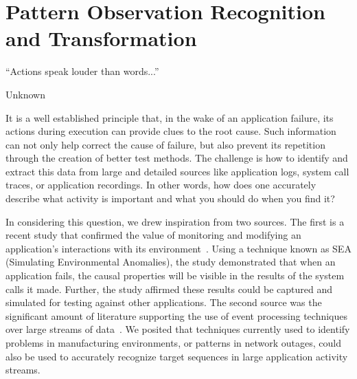 \chapter{Pattern Observation Recognition and Transformation}
\label{chap:port}


\epigraph{ ``Actions speak louder than words...'' }{Unknown}


It is a well established principle
that, in the wake of an application failure,
its actions
during execution can provide clues
to the root cause.
Such information
can not only help correct
the cause of failure,
but also prevent its repetition through the creation
of better test methods.
The challenge is 
how to identify and extract this data
from large and detailed sources like application logs,
system call traces,
or application recordings.
In other words, how does one
accurately describe what activity is important
and what you should do when you find it?

In considering this question,  we drew inspiration from two sources. The
first is a recent study that confirmed the value of monitoring and
modifying an application’s  interactions with its environment~\cite{DBLP:conf/issre/MooreCFW19}.  Using a technique known as SEA (Simulating Environmental Anomalies), the study demonstrated that when an application fails, the causal properties
will be visible in the results of the system calls it made. Further, the study affirmed these results could
be captured and simulated for testing against other applications.  The
second source was the significant amount of literature supporting the use of event
processing techniques over large streams of data~\cite{DBLP:conf/sigmod/AgrawalDGI08,DBLP:conf/debs/Hirzel12,DBLP:journals/ibmrd/HirzelAGJKKMNSSW13,DBLP:journals/csur/DayarathnaP18}. We posited that techniques
currently used to identify problems in  manufacturing environments, or patterns in
network outages, could also be used to accurately recognize target
sequences in large
application activity streams.

